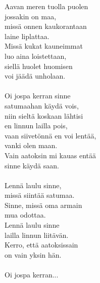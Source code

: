 
        Aavan meren tuolla puolen \\
        jossakin on maa, \\
        missä onnen kaukorantaan \\
        laine liplattaa. \\
        Missä kukat kauneimmat \\
        luo aina loistettaan, \\
        siellä huolet huomisen \\
        voi jäädä unholaan. \\
\hspace{10mm} \\
        Oi jospa kerran sinne \\
        satumaahan käydä vois, \\
        niin sieltä koskaan lähtisi \\
        en linnun lailla pois, \\
        vaan siivetönnä en voi lentää, \\
        vanki olen maan. \\
        Vain aatoksin mi kauas entää \\
        sinne käydä saan. \\
\hspace{10mm} \\
        Lennä laulu sinne, \\
        missä siintää satumaa. \\
        Sinne, missä oma armain \\
        mua odottaa. \\
        Lennä laulu sinne \\
        lailla linnun liitävän. \\
        Kerro, että aatoksissain \\
        on vain yksin hän. \\
\hspace{10mm} \\
        Oi jospa kerran... \\
